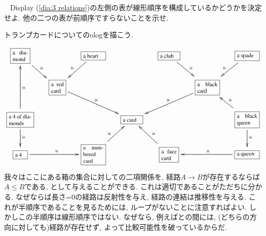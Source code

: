 \begin{exercise}~
\sexc Display (\ref{dia:3 relations})の左側の表が線形順序を構成しているかどうかを決定せよ. 
\next 他の二つの表が前順序ですらないことを示せ.
\endsexc
\end{exercise}

\begin{example}[半順序だが線形順序ではない例]\label{ex:pre not par}

トランプカードについてのologを描こう.
\begin{align}\label{dia:card olog}
\footnotesize
\xymatrixnocompile@=15pt{
\obox{}{.3in}{a diamond}\ar[dr]^{\tn{is}}&&\obox{}{.4in}{a heart}\ar[dl]_{\tn{is}}&&\obox{}{.35in}{a club}\ar[dr]^{\tn{is}}&&\obox{}{.4in}{a spade}\ar[dl]_{\tn{is}}\\
&\obox{}{.25in}{a red card}\ar[drr]^{\tn{is}}&&&&\obox{}{.4in}{a black card}\ar[dll]_{\tn{is}}\\
\obox{}{.45in}{a 4 of diamonds}\ar[d]^{\tn{is}}\ar[uu]_{\tn{is}}&&&\obox{}{.35in}{a card}&&&\obox{}{.4in}{a black queen}\ar[d]^{\tn{is}}\ar[ul]_{\tn{is}}\\
\obox{}{.2in}{a 4}\ar[rr]^{\tn{is}}&&\obox{}{.4in}{a numbered card}\ar[ur]^{\tn{is}}&&\obox{}{.3in}{a face card}\ar[ul]_{\tn{is}}&&\obox{}{.4in}{a queen}\ar[ll]_{\tn{is}}
}
\end{align}
我々はここにある箱の集合に対しての二項関係を, 経路$A\to B$が存在するならば$A\leq B$である, として与えることができる. これは適切であることがただちに分かる. なぜならば長さ=0の経路は反射性を与え, 経路の連結は推移性を与える. これが半順序であることを見るためには, ループがないことに注意すればよい. しかしこの半順序は線形順序ではない. なぜなら, 例えばとの間には, (どちらの方向に対しても)経路が存在せず, よって比較可能性を破っているからだ.

\end{example}

